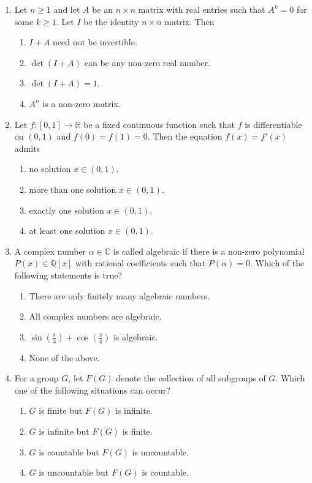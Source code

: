 \documentclass[11pt, a4paper]{article}
\begin{document}
\begin{enumerate}[resume]
  \item Let $n \ge 1$ and let $A$ be an $n \times n$ matrix with real entries such that $A^k = 0$ for some $k \ge 1$. Let $I$ be the identity $n \times n$ matrix. Then
  \begin{enumerate}[label=\Alph*.]
    \item $I + A$ need not be invertible.
    \item $\det(I + A)$ can be any non-zero real number.
    \item $\det(I + A) = 1$.
    \item $A^n$ is a non-zero matrix.
  \end{enumerate}

  \item Let $f: [0, 1] \to \mathbb{R}$ be a fixed continuous function such that $f$ is differentiable on $(0, 1)$ and $f(0) = f(1) = 0$. Then the equation $f(x) = f'(x)$ admits
  \begin{enumerate}[label=\Alph*.]
    \item no solution $x \in (0, 1)$.
    \item more than one solution $x \in (0, 1)$.
    \item exactly one solution $x \in (0, 1)$.
    \item at least one solution $x \in (0, 1)$.
  \end{enumerate}

  \item A complex number $\alpha \in \mathbb{C}$ is called algebraic if there is a non-zero polynomial $P(x) \in \mathbb{Q}[x]$ with rational coefficients such that $P(\alpha) = 0$. Which of the following statements is true?
  \begin{enumerate}[label=\Alph*.]
    \item There are only finitely many algebraic numbers.
    \item All complex numbers are algebraic.
    \item $\sin\left(\frac{\pi}{3}\right) + \cos\left(\frac{\pi}{4}\right)$ is algebraic.
    \item None of the above.
  \end{enumerate}

  \item For a group $G$, let $F(G)$ denote the collection of all subgroups of $G$. Which one of the following situations can occur?
  \begin{enumerate}[label=\Alph*.]
    \item $G$ is finite but $F(G)$ is infinite.
    \item $G$ is infinite but $F(G)$ is finite.
    \item $G$ is countable but $F(G)$ is uncountable.
    \item $G$ is uncountable but $F(G)$ is countable.
  \end{enumerate}


\end{enumerate}
\end{document}
